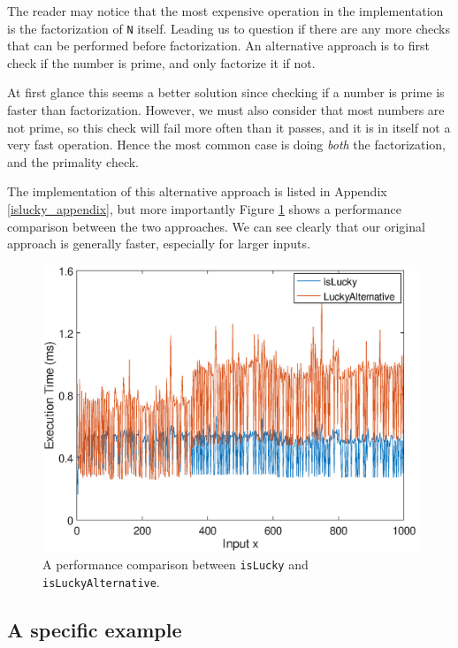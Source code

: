 \documentclass[10pt]{article}
\begin{document}
The reader may notice that the most expensive operation in the implementation is the factorization of \texttt{N} itself. Leading us to question if there are any more checks that can be performed before factorization. An alternative approach is to first check if the number is prime, and only factorize it if not.

At first glance this seems a better solution since checking if a number is prime is faster than factorization. However, we must also consider that most numbers are not prime, so this check will fail more often than it passes, and it is in itself not a very fast operation. Hence the most common case is doing \emph{both} the factorization, and the primality check.


The implementation of this alternative approach is listed in Appendix \ref{islucky_appendix}, but more importantly Figure \ref{isluckytest} shows a performance comparison between the two approaches. We can see clearly that our original approach is generally faster, especially for larger inputs.


\begin{figure}[h]
\centering
   \includegraphics[scale=0.5]{islucky_test.eps}

   \caption{A performance comparison between \texttt{isLucky} and \texttt{isLuckyAlternative}.}
      \label{isluckytest}
\end{figure}



\subsection{A specific example}
\end{document}
